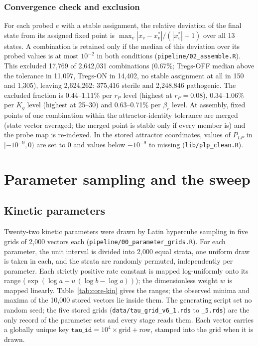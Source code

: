 \documentclass[11pt]{article}
\begin{document}
\subsubsection{Convergence check and exclusion}
\label{sec:trust}

For each probed $e$ with a stable assignment, the relative deviation of the final state
from its assigned fixed point is $\max_v |x_v - x^*_v|/(|x^*_v|+1)$ over all 13 states.
A combination is retained only if the median of this deviation over its probed values
is at most $10^{-2}$ in both conditions (\texttt{pipeline/02\_assemble.R}). This
excluded 17,769 of 2,642,031 combinations (0.67\%; Tregs-OFF median above the
tolerance in 11,097, Tregs-ON in 14,402, no stable assignment at all in 150 and 1,305),
leaving 2,624,262: 375,416 sterile and 2,248,846 pathogenic. The excluded fraction is
0.44--1.11\% per $r_P$ level (highest at $r_P = 0.08$), 0.34--1.06\% per $K_g$ level
(highest at 25--30) and 0.63--0.71\% per $\beta_r$ level.
At assembly, fixed points of one combination within the attractor-identity tolerance
are merged (state vector averaged; the merged point is stable only if every member is)
and the probe map is re-indexed. In the stored attractor coordinates, values of $P_{LP}$
in $[-10^{-9}, 0)$ are set to 0 and values below $-10^{-9}$ to missing
(\texttt{lib/plp\_clean.R}).

\section{Parameter sampling and the sweep}
\label{sec:sampling}

\subsection{Kinetic parameters}

Twenty-two kinetic parameters were drawn by Latin hypercube sampling in five grids of
2,000 vectors each (\texttt{pipeline/00\_parameter\_grids.R}). For each parameter, the
unit interval is divided into 2,000 equal strata, one uniform draw is taken in each,
and the strata are randomly permuted, independently per parameter. Each strictly
positive rate constant is mapped log-uniformly onto its range
($\exp(\log a + u\,(\log b - \log a))$); the dimensionless weight $w$ is mapped
linearly. Table~\ref{tab:core-kin} gives the ranges; the observed minima and maxima of
the 10,000 stored vectors lie inside them. The generating script set
no random seed; the five stored grids (\texttt{data/tau\_grid\_v6\_1.rds} to
\texttt{\_5.rds}) are the only record of the parameter sets and every stage reads them.
Each vector carries a globally unique key $\texttt{tau\_id} = 10^4 \times
\text{grid} + \text{row}$, stamped into the grid when it is drawn.
\end{document}
